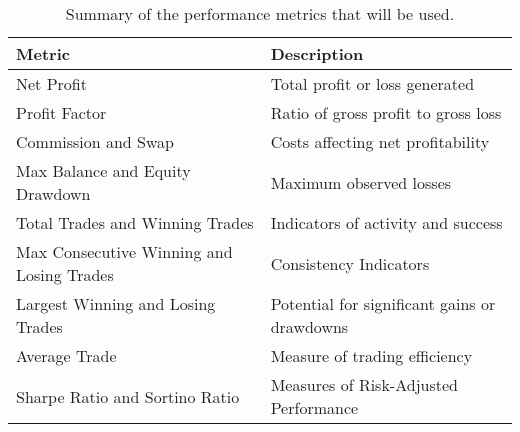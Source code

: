 \begin{table}[htb!]
\centering
\footnotesize
\begin{tabularx}{\textwidth}{@{}lX@{}}
\toprule
\textbf{Metric} & \textbf{Description} \\
\midrule
Net Profit & Total profit or loss generated \\
\addlinespace
Profit Factor & Ratio of gross profit to gross loss \\
\addlinespace
Commission and Swap & Costs affecting net profitability \\
\addlinespace
Max Balance and Equity Drawdown & Maximum observed losses \\
\addlinespace
Total Trades and Winning Trades & Indicators of activity and success \\
\addlinespace
Max Consecutive Winning and Losing Trades & Consistency Indicators \\
\addlinespace
Largest Winning and Losing Trades & Potential for significant gains or drawdowns \\
\addlinespace
Average Trade & Measure of trading efficiency \\
\addlinespace
Sharpe Ratio and Sortino Ratio & Measures of Risk-Adjusted Performance \\
\bottomrule
\end{tabularx}
\caption{Summary of the performance metrics that will be used.}
\label{Tables:PerformanceMetrics}
\end{table}
